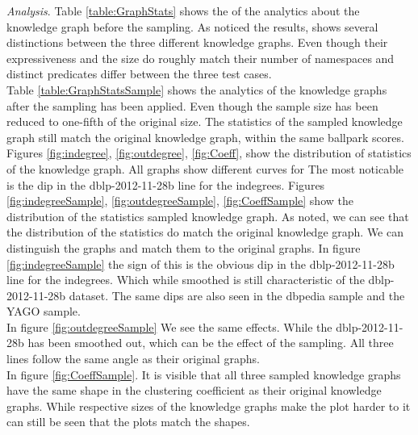 \documentclass[11pt,letterpaper ,oneside ]{book}
\begin{document}
\begin{table}[!t]
	\centering
	\caption{table showing several statistics about graphs.}
	\label{table:GraphStatsSample}
\end{table}

\textit{Analysis}. Table \ref{table:GraphStats} shows the of the analytics about the knowledge graph before the sampling. As noticed the results, shows several distinctions between the three different knowledge graphs. Even though their expressiveness and the size do roughly match their number of namespaces and distinct predicates differ between the three test cases.\\
Table \ref{table:GraphStatsSample} shows the analytics of the knowledge graphs after the sampling has been applied. Even though the sample size has been reduced to one-fifth of the original size. The statistics of the sampled knowledge graph still match the original knowledge graph, within the same ballpark scores.
Figures \ref{fig:indegree},  \ref{fig:outdegree},  \ref{fig:Coeff}, show the distribution of statistics of the knowledge graph. All graphs show different curves for The most noticable is the dip in the dblp-2012-11-28b line for the indegrees. 
Figures \ref{fig:indegreeSample},  \ref{fig:outdegreeSample},  \ref{fig:CoeffSample} show the distribution of the statistics sampled knowledge graph. As noted, we can see that the distribution of the statistics do match the original knowledge graph. We can distinguish the graphs and match them to the original graphs. 
In figure \ref{fig:indegreeSample} the sign of this is the obvious dip in the dblp-2012-11-28b line for the indegrees. Which while smoothed is still characteristic of the dblp-2012-11-28b dataset. The same dips are also seen in the dbpedia sample and the YAGO sample.\\
In figure \ref{fig:outdegreeSample} We see the same effects. While the dblp-2012-11-28b has been smoothed out, which can be the effect of the sampling. All three lines follow the same angle as their original graphs.\\
In figure \ref{fig:CoeffSample}. It is visible that all three sampled knowledge graphs have the same shape in the clustering coefficient as their original knowledge graphs. While respective sizes of the knowledge graphs make the plot harder to it can still be seen that the plots match the shapes.
\end{document}

